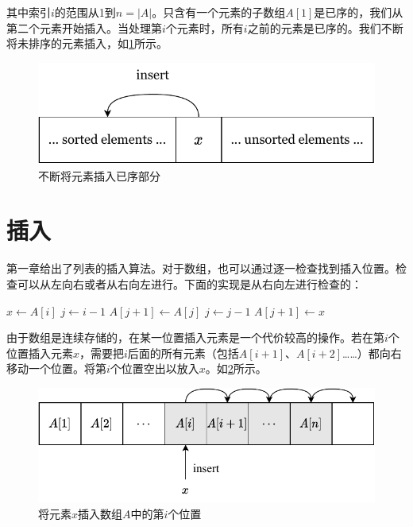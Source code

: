 \documentclass[b5paper]{ctexart}
\begin{document}
其中索引$i$的范围从1到$n = |A|$。只含有一个元素的子数组$A[1]$是已序的，我们从第二个元素开始插入。当处理第$i$个元素时，所有$i$之前的元素是已序的。我们不断将未排序的元素插入，如\cref{fig:in-place-isort}所示。

\begin{figure}[htbp]
  \centering
  \includegraphics[scale=0.7]{img/insert-sort}
  \caption{不断将元素插入已序部分}
  \label{fig:in-place-isort}
\end{figure}

\section{插入}

第一章给出了列表的插入算法。对于数组，也可以通过逐一检查找到插入位置。检查可以从左向右或者从右向左进行。下面的实现是从右向左进行检查的：

\begin{algorithmic}[1]
    \State $x \gets A[i]$ 
    \State $j \gets i-1$
      \State $A[j+1] \gets A[j]$
      \State $j \gets j - 1$
    \EndWhile
    \State $A[j+1] \gets x$
  \EndFor
\EndFunction
\end{algorithmic}

由于数组是连续存储的，在某一位置插入元素是一个代价较高的操作。若在第$i$个位置插入元素$x$，需要把$i$后面的所有元素（包括$A[i+1]$、$A[i+2]$……）都向右移动一个位置。将第$i$个位置空出以放入$x$。如\cref{fig:array-shift}所示。

\begin{figure}[htbp]
  \centering
  \includegraphics[scale=0.7]{img/array-shift}
  \caption{将元素$x$插入数组$A$中的第$i$个位置}
  \label{fig:array-shift}
\end{figure}
\end{document}
